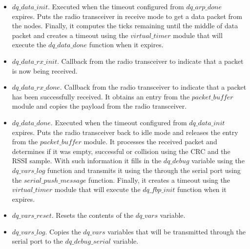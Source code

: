 \begin{itemize}
\item $dq\_data\_init$. Executed when the timeout configured from $dq\_arp\_done$ expires. Puts the radio transceiver in receive mode to get a data packet from the nodes. Finally, it computes the ticks remaining until the middle of data packet and creates a timeout using the $virtual\_timer$ module that will execute the $dq\_data\_done$ function when it expires.
\item $dq\_data\_rx\_init$. Callback from the radio transceiver to indicate that a packet is now being received.
\item $dq\_data\_rx\_done$. Callback from the radio transceiver to indicate that a packet has been successfully received. It obtains an entry from the $packet\_buffer$ module and copies the payload from the radio transceiver.
\item $dq\_data\_done$. Executed when the timeout configured from $dq\_data\_init$ expires. Puts the radio transceiver back to idle mode and releases the entry from the $packet\_buffer$ module. It processes the received packet and determines if it was empty, successful or collision using the CRC and the RSSI sample. With such information it fills in the $dq\_debug$ variable using the $dq\_vars\_log$ function and transmits it using the through the serial port using the $serial\_push\_message$ function. Finally, it creates a timeout using the $virtual\_timer$ module that will execute the $dq\_fbp\_init$ function when it expires.

\item $dq\_vars\_reset$. Resets the contents of the $dq\_vars$ variable.
\item $dq\_vars\_log$. Copies the $dq\_vars$ variables that will be transmitted through the serial port to the $dq\_debug\_serial$ variable.
\end{itemize}

